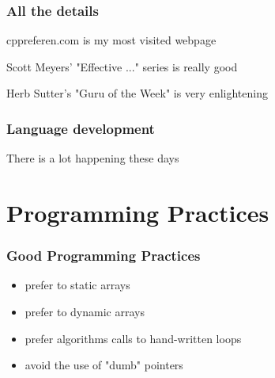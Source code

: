 \documentclass[14pt,a4paper,dvipsnames,usenames]{beamer}
\begin{document}
\begin{frame}[fragile]
  \frametitle{All the details}

  {\color{Tropiteal}cppreferen.com} \:is my most visited webpage

  \vspace{1cm}
  Scott Meyers' "Effective ..." series is {\large really} good

  \vspace{1cm}
  Herb Sutter's "Guru of the Week" is very enlightening


  
\end{frame}

\begin{frame}[fragile]
  \frametitle{Language development}

  There is a lot happening these days

  \vspace{1cm}
  \hspace*{-.5cm}
  
\end{frame}

\section{Programming Practices}

\frame[plain]{\sectionpage}

\begin{frame}
  \frametitle{Good Programming Practices}

  \begin{itemize}
    \setlength\itemsep{0.75em}
    \item prefer  to static arrays
    \item prefer  to dynamic arrays
    \item prefer algorithms calls to hand-written loops
    \item avoid the use of "dumb" pointers
  \end{itemize}
  
\end{frame}
\end{document}
